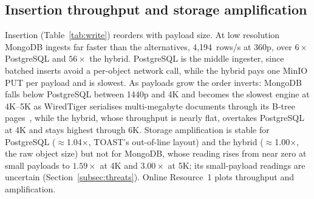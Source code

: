 \documentclass[pdflatex,sn-basic]{sn-jnl}%
\begin{document}
\subsection{Insertion throughput and storage amplification}\label{subsec:insert}
{\color{markup}Insertion (Table~\ref{tab:write}) reorders with payload size.} {\color{markup}At low resolution MongoDB ingests far faster than the alternatives, 4{,}194~rows/s at 360p, over $6\times$ PostgreSQL and $56\times$ the hybrid.} {\color{markup}PostgreSQL is the middle ingester, since batched inserts avoid a per-object network call, while the hybrid pays one MinIO PUT per payload and is slowest.} {\color{markup}As payloads grow the order inverts: MongoDB falls below PostgreSQL between 1440p and 4K and becomes the slowest engine at 4K--5K as WiredTiger serialises multi-megabyte documents through its B-tree pages~\citep{wiredtiger_btree_architecture}, while the hybrid, whose throughput is nearly flat, overtakes PostgreSQL at 4K and stays highest through 6K.} {\color{markup}Storage amplification is stable for PostgreSQL ($\approx$1.04$\times$, TOAST's out-of-line layout) and the hybrid ($\approx$1.00$\times$, the raw object size) but not for MongoDB, whose reading rises from near zero at small payloads to $1.59\times$ at 4K and $3.00\times$ at 5K; its small-payload readings are uncertain (Section~\ref{subsec:threats}).} {\color{markup}Online Resource~1 plots throughput and amplification.}
\end{document}
